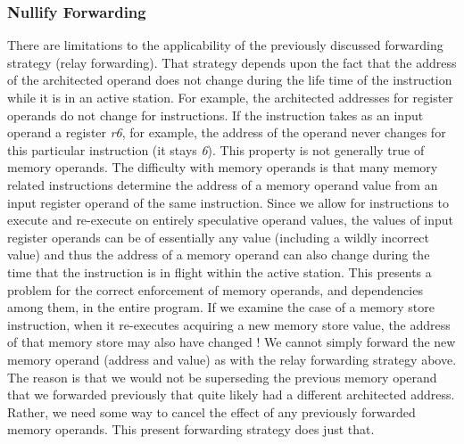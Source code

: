 \documentclass[10pt,dvips]{article}
\begin{document}
\subsubsection{Nullify Forwarding}
%
There are limitations to the applicability of the previously
discussed forwarding strategy (relay forwarding).
That strategy depends upon the fact that the address of the
architected operand does not change during the life time of
the instruction while it is in an active station.
For example, the architected addresses for register operands
do not change for instructions.  If the instruction takes
as an input operand a register \textit{r6}, for example,
the address of the operand never changes for this particular
instruction (it stays \textit{6}).
This property is not generally true of memory operands.
The difficulty with memory operands is that many memory
related instructions determine the address of a memory operand
value from an input register operand of the same instruction.
Since we allow for instructions to execute and re-execute
on entirely speculative operand values, the values of
input register operands can be of essentially any value
(including a wildly incorrect value) and thus the
address of a memory operand can also change during the time
that the instruction is in flight within the active station.
This presents a problem for the correct enforcement of
memory operands, and dependencies among them, in the entire program.
If we examine the case of a memory store instruction,
when it
re-executes acquiring a new memory store value, the address of that
memory store may also have changed !  
We cannot simply forward the new memory operand (address and value)
as with the relay forwarding strategy above.  The reason is
that we would not be superseding the previous memory operand
that we forwarded previously that quite likely had a different
architected address.  Rather, we need some way to cancel the effect of
any previously forwarded memory operands.
This present forwarding strategy does just that.
\end{document}
